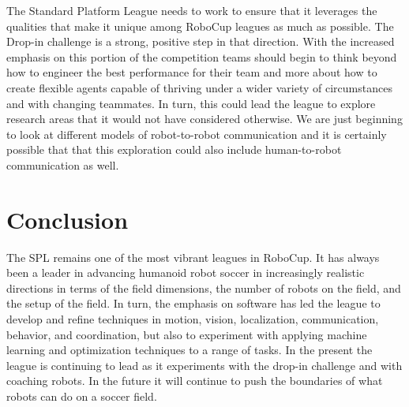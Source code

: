 \documentclass{llncs}
\begin{document}
The Standard Platform League 
needs to work to ensure that it leverages the qualities that make it unique among RoboCup leagues as much
as possible. The Drop-in challenge is a strong, positive step in that direction. With the
increased emphasis on this portion of the competition teams should begin to think beyond
how to engineer the best performance for their team and more about how to create flexible
agents capable of thriving under a wider variety of circumstances and with changing
teammates. In turn, this could lead the league to explore research areas that it would not have considered
otherwise. We are just beginning to look at different models of robot-to-robot communication and
it is certainly possible that that this exploration could also include human-to-robot communication
as well.

\section{Conclusion}

The SPL remains one of the most vibrant leagues in RoboCup. It has always been a leader in
advancing humanoid robot soccer in increasingly realistic directions in terms of the field dimensions, the
number of robots on the field, and the setup of the field. In turn, the emphasis on software has
led the league to develop
and refine techniques in motion, vision, localization, communication, behavior, and coordination, but also to experiment with applying machine learning and optimization techniques to a range of tasks. In the present the league is
continuing to lead as it experiments with the drop-in challenge and with coaching robots. In the future
it will continue to push the boundaries of what robots can do on a soccer field.


 
\end{document}
